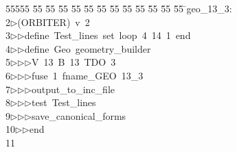 %
%
\begin{tabbing}
55555 \= 55 \= 55 \= 55 \= 55 \= 55 \= 55 \= 55 \= 55 \= 55 \= 55 \= 55 \= 55 \= \>geo\_13\_3:\\[0pt]
2\>$\triangleright$\>(ORBITER)\ v\ 2\ \\[0pt]
3\>$\triangleright$\>$\triangleright$\>define\ Test\_lines\ set\ loop\ 4\ 14\ 1\ end\ \\[0pt]
4\>$\triangleright$\>$\triangleright$\>define\ Geo\ geometry\_builder\ \\[0pt]
5\>$\triangleright$\>$\triangleright$\>$\triangleright$\>V\ 13\ B\ 13\ TDO\ 3\ \\[0pt]
6\>$\triangleright$\>$\triangleright$\>$\triangleright$\>fuse\ 1\ fname\_GEO\ 13\_3\ \\[0pt]
7\>$\triangleright$\>$\triangleright$\>$\triangleright$\>output\_to\_inc\_file\ \\[0pt]
8\>$\triangleright$\>$\triangleright$\>$\triangleright$\>test\ Test\_lines\ \\[0pt]
9\>$\triangleright$\>$\triangleright$\>$\triangleright$\>save\_canonical\_forms\ \\[0pt]
10\>$\triangleright$\>$\triangleright$\>end\\[0pt]
11\>\end{tabbing}
